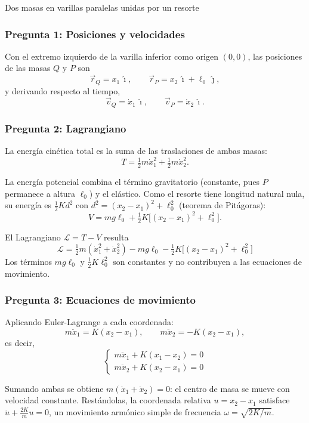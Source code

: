\begin{solucion}{Dos masas en varillas paralelas unidas por un resorte}
\subsubsection*{Pregunta 1: Posiciones y velocidades}

Con el extremo izquierdo de la varilla inferior como origen $(0,0)$, las posiciones de las
masas $Q$ y $P$ son
$$\vec{r}_Q = x_1\,\hat{\imath},\qquad \vec{r}_P = x_2\,\hat{\imath} + \ell_0\,\hat{\jmath},$$
y derivando respecto al tiempo,
$$\vec{v}_Q = \dot{x}_1\,\hat{\imath},\qquad \vec{v}_P = \dot{x}_2\,\hat{\imath}.$$

\subsubsection*{Pregunta 2: Lagrangiano}

La energía cinética total es la suma de las traslaciones de ambas masas:
$$T = \tfrac12 m\dot{x}_1^2 + \tfrac12 m\dot{x}_2^2.$$

La energía potencial combina el término gravitatorio (constante, pues $P$ permanece a
altura $\ell_0$) y el elástico. Como el resorte tiene longitud natural nula, su energía es
$\tfrac12 K d^2$ con $d^2=(x_2-x_1)^2+\ell_0^2$ (teorema de Pitágoras):
$$V = m g\ell_0 + \tfrac12 K\big[(x_2-x_1)^2 + \ell_0^2\big].$$

El Lagrangiano $\mathcal{L}=T-V$ resulta
$$\boxed{\;\mathcal{L} = \tfrac12 m(\dot{x}_1^2 + \dot{x}_2^2)
- m g\ell_0 - \tfrac12 K\big[(x_2-x_1)^2 + \ell_0^2\big]\;}$$
Los términos $m g\ell_0$ y $\tfrac12 K\ell_0^2$ son constantes y no contribuyen a las
ecuaciones de movimiento.

\subsubsection*{Pregunta 3: Ecuaciones de movimiento}

Aplicando Euler-Lagrange a cada coordenada:
$$m\ddot{x}_1 = K(x_2-x_1),\qquad m\ddot{x}_2 = -K(x_2-x_1),$$
es decir,
$$\boxed{\begin{cases} m\ddot{x}_1 + K(x_1-x_2) = 0 \\[2pt] m\ddot{x}_2 + K(x_2-x_1) = 0\end{cases}}$$

Sumando ambas se obtiene $m(\ddot{x}_1+\ddot{x}_2)=0$: el centro de masa se mueve con
velocidad constante. Restándolas, la coordenada relativa $u=x_2-x_1$ satisface
$\ddot{u} + \tfrac{2K}{m}u = 0$, un movimiento armónico simple de frecuencia
$\omega=\sqrt{2K/m}$.
\end{solucion}
